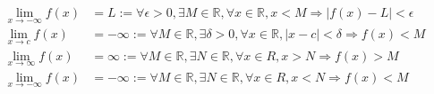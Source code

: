 \documentclass[14pt]{extarticle}
\newcommand{\R}{{\mathbb R}}
\newcommand{\0}{{\mathbf 0}}
\newcommand{\1}{{\mathbf 1}}
\newcommand{\2}{{\mathbf 2}}
\begin{document}
\begin{align*}
\lim_{x \to -\infty} f(x) &= L := \forall \epsilon > 0, \exists M \in \R, \forall x \in \R, x < M \Longrightarrow |f(x) - L| < \epsilon \\
\lim_{x \to c} f(x) &= -\infty := \forall M \in \R, \exists \delta > 0, \forall x \in \R, |x - c| < \delta \Longrightarrow f(x) < M \\
\lim_{x \to \infty} f(x) &= \infty := \forall M \in \R, \exists N \in \R, \forall x \in R, x > N \Longrightarrow f(x) > M \\
\lim_{x \to -\infty} f(x) &= -\infty := \forall M \in \R, \exists N \in \R, \forall x \in R, x < N \Longrightarrow f(x) < M\\
\end{align*}
\end{document}
